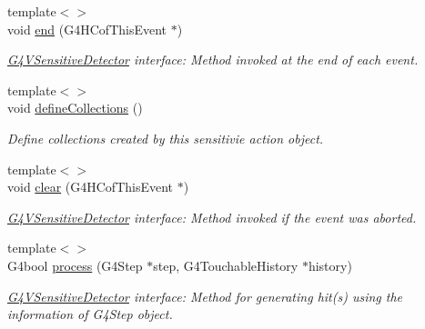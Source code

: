 \begin{DoxyCompactItemize}
{\footnotesize template$<$$>$ }\\void \hyperlink{class_d_d4hep_1_1_simulation_1_1_geant4_sensitive_action_a09d62eb1a5e2511537b371585e3f60a5}{end} (G4HCofThisEvent $\ast$)
\begin{DoxyCompactList}\small\item\em \hyperlink{class_g4_v_sensitive_detector}{G4VSensitiveDetector} interface: Method invoked at the end of each event. \item\end{DoxyCompactList}\item 
{\footnotesize template$<$$>$ }\\void \hyperlink{class_d_d4hep_1_1_simulation_1_1_geant4_sensitive_action_a0d2c4744420ef0f886d26e424d2357ba}{defineCollections} ()
\begin{DoxyCompactList}\small\item\em Define collections created by this sensitivie action object. \item\end{DoxyCompactList}\item 
{\footnotesize template$<$$>$ }\\void \hyperlink{class_d_d4hep_1_1_simulation_1_1_geant4_sensitive_action_a686893fef6dd49fb66408e09f1f6de18}{clear} (G4HCofThisEvent $\ast$)
\begin{DoxyCompactList}\small\item\em \hyperlink{class_g4_v_sensitive_detector}{G4VSensitiveDetector} interface: Method invoked if the event was aborted. \item\end{DoxyCompactList}\item 
{\footnotesize template$<$$>$ }\\G4bool \hyperlink{class_d_d4hep_1_1_simulation_1_1_geant4_sensitive_action_a97df218d3791d86a41d0ad52a780e87e}{process} (G4Step $\ast$step, G4TouchableHistory $\ast$history)
\begin{DoxyCompactList}\small\item\em \hyperlink{class_g4_v_sensitive_detector}{G4VSensitiveDetector} interface: Method for generating hit(s) using the information of G4Step object. \item\end{DoxyCompactList}\end{DoxyCompactItemize}
